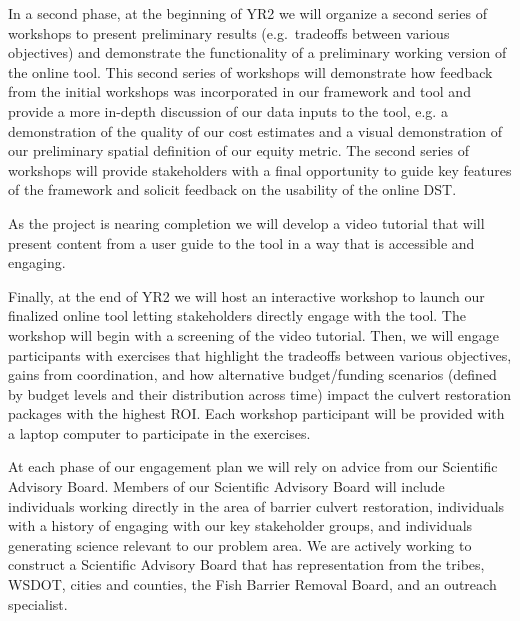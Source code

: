 \documentclass[12pt]{elsarticle}
\begin{document}
In a second phase, at the beginning of YR2 we will organize a second series of workshops to present preliminary results (e.g.\ tradeoffs between various objectives) and demonstrate the functionality of a preliminary working version of the online tool. This second series of workshops will demonstrate how feedback from the initial workshops was incorporated in our framework and tool and provide a more in-depth discussion of our data inputs to the tool, e.g. a demonstration of the quality of our cost estimates and a visual demonstration of our preliminary spatial definition of our equity metric. The second series of workshops will provide stakeholders with a final opportunity to guide key features of the framework and solicit feedback on the usability of the online DST.

As the project is nearing completion we will develop a video tutorial that will present content from a user guide to the tool in a way that is accessible and engaging.

Finally, at the end of YR2 we will host an interactive workshop to launch our finalized online tool letting stakeholders directly engage with the tool. The workshop will begin with a screening of the video tutorial. Then, we will engage participants with exercises that highlight the tradeoffs between various objectives, gains from coordination, and how alternative budget/funding scenarios (defined by budget levels and their distribution across time) impact the culvert restoration packages with the highest ROI. Each workshop participant will be provided with a laptop computer to participate in the exercises. 

At each phase of our engagement plan we will rely on advice from our Scientific Advisory Board. Members of our Scientific Advisory Board will include individuals working directly in the area of barrier culvert restoration, individuals with a history of engaging with our key stakeholder groups, and individuals generating science relevant to our problem area. We are actively working to construct a Scientific Advisory Board that has representation from the tribes, WSDOT, cities and counties, the Fish Barrier Removal Board, and an outreach specialist.

\end{document}

